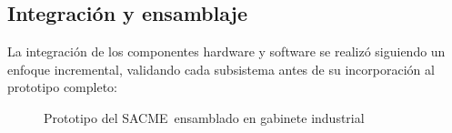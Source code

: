 \documentclass{report}          %
\newcommand{\shortname}     {SACME}
\begin{document}
            \subsection{Integración y ensamblaje}
                La integración de los componentes hardware y software se realizó siguiendo un enfoque incremental, validando cada subsistema antes de su incorporación al prototipo completo:

                \begin{figure}[H]
                    \centering
                    \caption{Prototipo del \shortname\ ensamblado en gabinete industrial}
                \end{figure}
\end{document}
